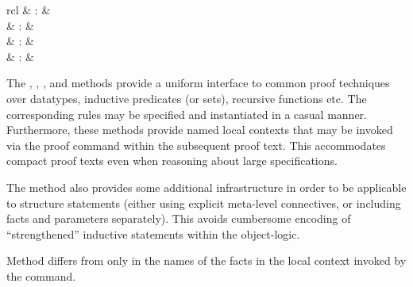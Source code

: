 \begin{isabellebody}
\begin{isamarkuptext}
\begin{description}
  \end{description}%
\end{isamarkuptext}%
\isamarkuptrue%
%
\isamarkuptrue%
%
\begin{isamarkuptext}%
\begin{matharray}{rcl}
    \hypertarget{method.cases}{\hyperlink{method.cases}{\mbox{}}} & : &  \\
    \hypertarget{method.induct}{\hyperlink{method.induct}{\mbox{}}} & : &  \\
    \hypertarget{method.induction}{\hyperlink{method.induction}{\mbox{}}} & : &  \\
    \hypertarget{method.coinduct}{\hyperlink{method.coinduct}{\mbox{}}} & : &  \\
  \end{matharray}

  The \hyperlink{method.cases}{\mbox{}}, \hyperlink{method.induct}{\mbox{}}, \hyperlink{method.induction}{\mbox{}},
  and \hyperlink{method.coinduct}{\mbox{}}
  methods provide a uniform interface to common proof techniques over
  datatypes, inductive predicates (or sets), recursive functions etc.
  The corresponding rules may be specified and instantiated in a
  casual manner.  Furthermore, these methods provide named local
  contexts that may be invoked via the \hyperlink{command.case}{\mbox{}} proof command
  within the subsequent proof text.  This accommodates compact proof
  texts even when reasoning about large specifications.

  The \hyperlink{method.induct}{\mbox{}} method also provides some additional
  infrastructure in order to be applicable to structure statements
  (either using explicit meta-level connectives, or including facts
  and parameters separately).  This avoids cumbersome encoding of
  ``strengthened'' inductive statements within the object-logic.

  Method \hyperlink{method.induction}{\mbox{}} differs from \hyperlink{method.induct}{\mbox{}} only in
  the names of the facts in the local context invoked by the \hyperlink{command.case}{\mbox{}}
  command.


\end{isamarkuptext}
\end{isabellebody}
